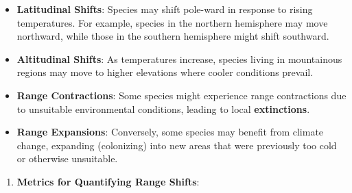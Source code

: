 \documentclass[
]{article}
\providecommand{\tightlist}{%
  \setlength{\itemsep}{0pt}\setlength{\parskip}{0pt}}
\begin{document}
\begin{itemize}
\item
  \textbf{Latitudinal Shifts}: Species may shift pole-ward in response
  to rising temperatures. For example, species in the northern
  hemisphere may move northward, while those in the southern hemisphere
  might shift southward.
\item
  \textbf{Altitudinal Shifts}: As temperatures increase, species living
  in mountainous regions may move to higher elevations where cooler
  conditions prevail.
\item
  \textbf{Range Contractions}: Some species might experience range
  contractions due to unsuitable environmental conditions, leading to
  local \textbf{extinctions}.
\item
  \textbf{Range Expansions}: Conversely, some species may benefit from
  climate change, expanding (colonizing) into new areas that were
  previously too cold or otherwise unsuitable.
\end{itemize}

\begin{enumerate}
\def\labelenumi{\alph{enumi})}
\setcounter{enumi}{2}
\tightlist
\item
  \textbf{Metrics for Quantifying Range Shifts}:
\end{enumerate}
\end{document}
